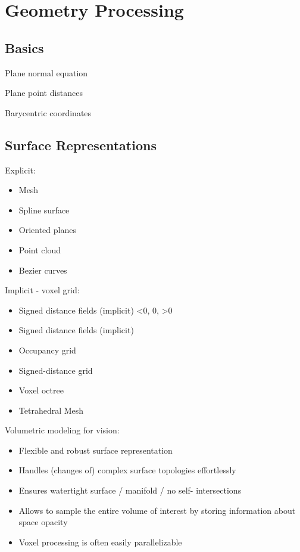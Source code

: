 \chapter{Geometry Processing} 

\section{Basics}

Plane normal equation

Plane point distances

Barycentric coordinates

\section{Surface Representations}

Explicit:
\begin{itemize}
\item Mesh
\item Spline surface
\item Oriented planes
\item Point cloud
\item Bezier curves
\end{itemize}

Implicit - voxel grid:
\begin{itemize}
\item Signed distance fields (implicit) <0, 0, >0
\item Signed distance fields (implicit)
\item Occupancy grid
\item Signed-distance grid
\item Voxel octree
\item Tetrahedral Mesh
\end{itemize}

Volumetric modeling for vision:
\begin{itemize}
\item Flexible and robust surface representation
\item Handles (changes of) complex surface topologies effortlessly
\item Ensures watertight surface / manifold / no self- intersections
\item Allows to sample the entire volume of interest by storing information about space opacity
\item Voxel processing is often easily parallelizable
\end{itemize}

